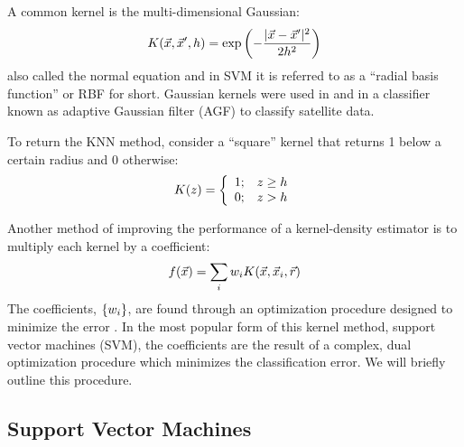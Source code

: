 \documentclass{article}
\newenvironment{eqnnon}{\begin{equation*}}{\end{equation*}}
\begin{document}
A common kernel is the multi-dimensional Gaussian:
\begin{eqnnon}
	\vectorkernel(\point, \point^\prime, \bandwidth) = \exp \left ( - \frac{|\point - \point^\prime|^2}{2 \bandwidth^2} \right )
	\label{Gaussian_kernel}
\end{eqnnon}
also called the normal equation and in SVM it is referred to as a
``radial basis function'' or RBF for short.
Gaussian kernels were used in \citet{Mills2009} and \citet{Mills2011} in a
classifier known as adaptive Gaussian filter (AGF)
to classify satellite data.

To return the KNN method, consider a ``square'' kernel that returns 1 below
a certain radius and 0 otherwise:
\begin{eqnnon}
	\scalarkernel(z) = \left \lbrace
	\begin{array}{lr}
		1; & z \ge \bandwidth \\
		0; & z > \bandwidth
	\end{array} \right .
\end{eqnnon}

Another method of improving the performance of a kernel-density estimator
is to multiply each kernel by a coefficient:
\begin{eqnnon}
	\densityestimator(\testpoint) = \sum_i \svmcoeff_i \vectorkernel(\testpoint, \sample_i, \kernelparam)
	\label{weighted_kernel_estimator}
\end{eqnnon}
The coefficients, $\lbrace w_i \rbrace$, are found through an optimization
procedure designed to minimize the error \citep{Chen_etal2015}. In the most popular
form of this kernel method, support vector machines (SVM), the coefficients
are the result of a complex, dual optimization procedure which minimizes
the classification error. We will briefly outline this procedure.

\subsection{Support Vector Machines}
\end{document}
